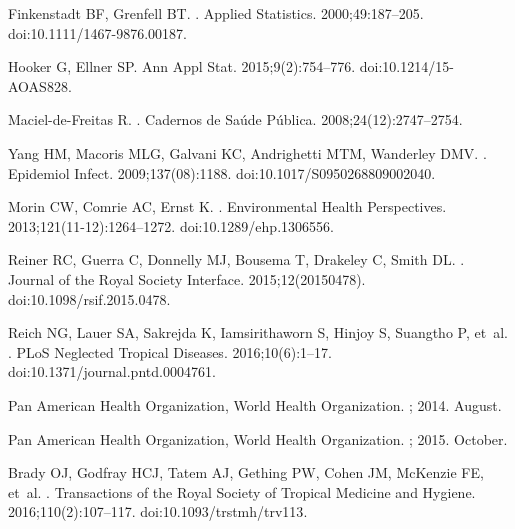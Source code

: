 \documentclass[10pt,letterpaper]{article}
\begin{document}
\begin{thebibliography}{10}
Finkenstadt BF, Grenfell BT.
.
\newblock Applied Statistics. 2000;49:187--205.
\newblock doi:{10.1111/1467-9876.00187}.

Hooker G, Ellner SP.
\newblock Ann Appl Stat. 2015;9(2):754--776.
\newblock doi:{10.1214/15-AOAS828}.

Maciel{-}de{-}Freitas R.
.
\newblock Cadernos de Sa{\'{u}}de P{\'{u}}blica. 2008;24(12):2747--2754.

Yang HM, Macoris MLG, Galvani KC, Andrighetti MTM, Wanderley DMV.
.
\newblock Epidemiol Infect. 2009;137(08):1188.
\newblock doi:{10.1017/S0950268809002040}.

Morin CW, Comrie AC, Ernst K.
.
\newblock Environmental Health Perspectives. 2013;121(11-12):1264--1272.
\newblock doi:{10.1289/ehp.1306556}.

Reiner RC, Guerra C, Donnelly MJ, Bousema T, Drakeley C, Smith DL.
.
\newblock Journal of the Royal Society Interface. 2015;12(20150478).
\newblock doi:{10.1098/rsif.2015.0478}.

Reich NG, Lauer SA, Sakrejda K, Iamsirithaworn S, Hinjoy S, Suangtho P, et~al.
.
\newblock PLoS Neglected Tropical Diseases. 2016;10(6):1--17.
\newblock doi:{10.1371/journal.pntd.0004761}.

{Pan American Health Organization}, {World Health Organization}.
; 2014. August.

{Pan American Health Organization}, {World Health Organization}.
; 2015. October.

Brady OJ, Godfray HCJ, Tatem AJ, Gething PW, Cohen JM, McKenzie FE, et~al.
.
\newblock Transactions of the Royal Society of Tropical Medicine and Hygiene.
  2016;110(2):107--117.
\newblock doi:{10.1093/trstmh/trv113}.


\end{thebibliography}
\end{document}
